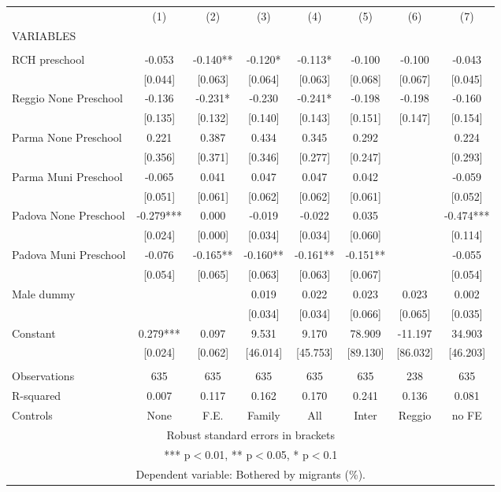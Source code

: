 \begin{tabular}{lccccccc} \hline
 & (1) & (2) & (3) & (4) & (5) & (6) & (7) \\
VARIABLES &  &  &  &  &  &  &  \\ \hline
 &  &  &  &  &  &  &  \\
RCH preschool & -0.053 & -0.140** & -0.120* & -0.113* & -0.100 & -0.100 & -0.043 \\
 & [0.044] & [0.063] & [0.064] & [0.063] & [0.068] & [0.067] & [0.045] \\
Reggio None Preschool & -0.136 & -0.231* & -0.230 & -0.241* & -0.198 & -0.198 & -0.160 \\
 & [0.135] & [0.132] & [0.140] & [0.143] & [0.151] & [0.147] & [0.154] \\
Parma None Preschool & 0.221 & 0.387 & 0.434 & 0.345 & 0.292 &  & 0.224 \\
 & [0.356] & [0.371] & [0.346] & [0.277] & [0.247] &  & [0.293] \\
Parma Muni Preschool & -0.065 & 0.041 & 0.047 & 0.047 & 0.042 &  & -0.059 \\
 & [0.051] & [0.061] & [0.062] & [0.062] & [0.061] &  & [0.052] \\
Padova None Preschool & -0.279*** & 0.000 & -0.019 & -0.022 & 0.035 &  & -0.474*** \\
 & [0.024] & [0.000] & [0.034] & [0.034] & [0.060] &  & [0.114] \\
Padova Muni Preschool & -0.076 & -0.165** & -0.160** & -0.161** & -0.151** &  & -0.055 \\
 & [0.054] & [0.065] & [0.063] & [0.063] & [0.067] &  & [0.054] \\
Male dummy &  &  & 0.019 & 0.022 & 0.023 & 0.023 & 0.002 \\
 &  &  & [0.034] & [0.034] & [0.066] & [0.065] & [0.035] \\
Constant & 0.279*** & 0.097 & 9.531 & 9.170 & 78.909 & -11.197 & 34.903 \\
 & [0.024] & [0.062] & [46.014] & [45.753] & [89.130] & [86.032] & [46.203] \\
 &  &  &  &  &  &  &  \\
Observations & 635 & 635 & 635 & 635 & 635 & 238 & 635 \\
R-squared & 0.007 & 0.117 & 0.162 & 0.170 & 0.241 & 0.136 & 0.081 \\
 Controls & None & F.E. & Family & All & Inter & Reggio & no FE \\ \hline
\multicolumn{8}{c}{ Robust standard errors in brackets} \\
\multicolumn{8}{c}{ *** p$<$0.01, ** p$<$0.05, * p$<$0.1} \\
\multicolumn{8}{c}{ Dependent variable: Bothered by migrants (\%).} \\
\end{tabular}
